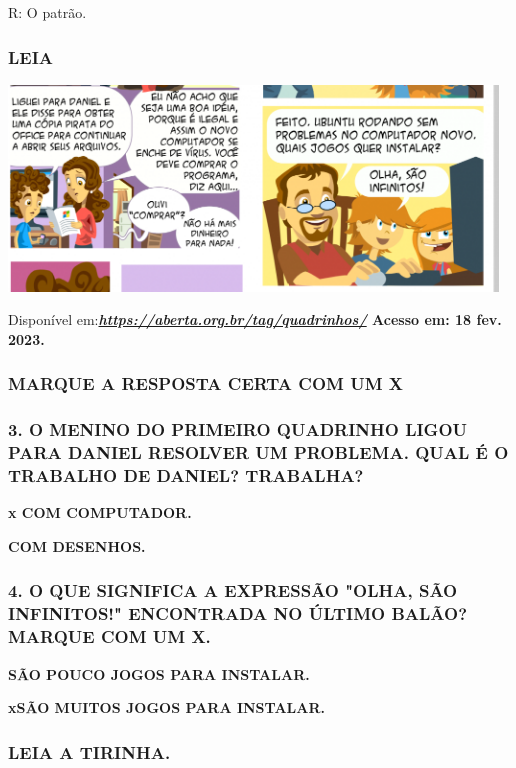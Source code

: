 R: O patrão.

\subsubsection{LEIA}\label{leia-2}

\includegraphics[width=5.11873in,height=2.15447in]{media/image172.png}

Disponível
em:\textbf{\href{https://aberta.org.br/tag/quadrinhos/}{\emph{https://aberta.org.br/tag/quadrinhos/}}
Acesso em: 18 fev. 2023.}

\subsubsection{MARQUE A RESPOSTA CERTA COM UM X
}\label{marque-a-resposta-certa-com-um-x}

\subsubsection{3. O MENINO DO PRIMEIRO QUADRINHO LIGOU PARA DANIEL
RESOLVER UM PROBLEMA. QUAL É O TRABALHO DE DANIEL?
TRABALHA?}\label{o-menino-do-primeiro-quadrinho-ligou-para-daniel-resolver-um-problema.-com-quuxea-daniel-trabalha}

\textbf{x COM COMPUTADOR.}

\textbf{COM DESENHOS.}

\subsubsection{4. O QUE SIGNIFICA A EXPRESSÃO "OLHA, SÃO INFINITOS!" ENCONTRADA NO
ÚLTIMO BALÃO? MARQUE COM UM
X.}\label{o-que-significa-a-espressuxe3o-olha-suxe3o-infinitos-no-uxfaltimo-baluxe3o-marque-com-um-x.}

\textbf{SÃO POUCO JOGOS PARA INSTALAR.}

\textbf{xSÃO MUITOS JOGOS PARA INSTALAR.}

\subsubsection{LEIA A TIRINHA.}\label{leia-a-tirinha.}

